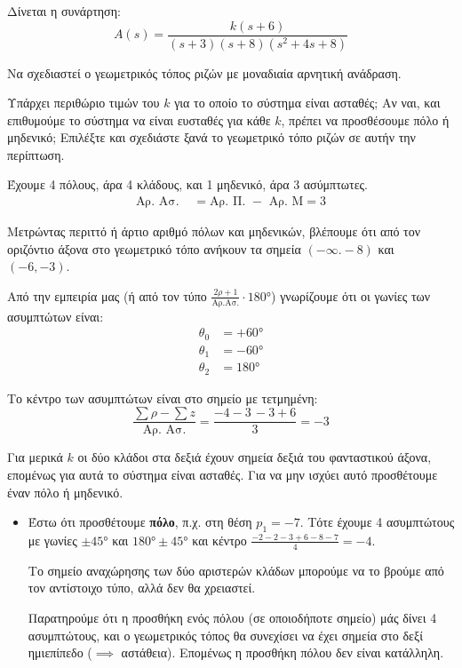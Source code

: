 \documentclass[11pt,a4paper,notitlepage,fleqn]{article}
\begin{document}
\begin{exercise}
Δίνεται η συνάρτηση:
\[
A(s) = \frac{k(s+6)}{(s+3)(s+8)(s^2+4s+8)}
\]

Να σχεδιαστεί ο γεωμετρικός τόπος ριζών με μοναδιαία αρνητική ανάδραση.

Υπάρχει περιθώριο τιμών του \( k \) για το οποίο το σύστημα είναι ασταθές; Αν ναι, και επιθυμούμε το σύστημα να είναι ευσταθές για κάθε \( k \), πρέπει να προσθέσουμε πόλο ή
μηδενικό; Επιλέξτε και σχεδιάστε ξανά το γεωμετρικό τόπο ριζών σε αυτήν την περίπτωση.

\tcblower

Έχουμε 4 πόλους, άρα 4 κλάδους, και 1 μηδενικό, άρα 3 ασύμπτωτες.
\begin{align*}
	\text{Αρ. Ασ. } &=\text{Αρ. Π. } - \text{ Αρ. Μ} = 3
\end{align*}

Μετρώντας περιττό ή άρτιο αριθμό πόλων και μηδενικών, βλέπουμε ότι από τον οριζόντιο άξονα
στο γεωμετρικό τόπο ανήκουν τα σημεία \( (-\infty.-8) \) και \( (-6,-3) \).

Από την εμπειρία μας (ή από τον τύπο \( \frac{2ρ+1}{\text{Αρ.Ασ.}}\cdot\ang{180} \)) γνωρίζουμε ότι οι γωνίες των ασυμπτώτων είναι:
\begin{align*}
	\theta_0 &= +\ang{60}\\
	\theta_1 &= -\ang{60}\\
	\theta_2 &= \ang{180}
\end{align*}

Το κέντρο των ασυμπτώτων είναι στο σημείο με τετμημένη:
\[
\frac{\sum ρ - \sum z}{\text{Αρ. Ασ.}}
= \frac{-4-3\,-3+6}{3} = -3
\]


Για μερικά \( k \) οι δύο κλάδοι στα δεξιά έχουν σημεία δεξιά του φανταστικού άξονα,
επομένως για αυτά το σύστημα είναι ασταθές. Για να μην ισχύει αυτό προσθέτουμε έναν πόλο ή μηδενικό.
\begin{itemize}
	\item Έστω ότι προσθέτουμε \textbf{πόλο}, π.χ. στη θέση \( p_1 = -7 \). Τότε έχουμε 4 ασυμπτώτους
	με γωνίες \( \pm \ang{45} \) και \( \ang{180} \pm \ang{45} \) και κέντρο
	\(\frac{-2-2-3+6-8-7}{4} = -4\).
	
	
	Το σημείο αναχώρησης των δύο αριστερών κλάδων μπορούμε να το βρούμε από τον αντίστοιχο
	τύπο, αλλά δεν θα χρειαστεί.
	
	Παρατηρούμε ότι η προσθήκη ενός πόλου (σε οποιοδήποτε σημείο) μάς δίνει 4 ασυμπτώτους,
	και ο γεωμετρικός τόπος θα συνεχίσει να έχει σημεία στο δεξί ημιεπίπεδο (\( \implies \)
	αστάθεια). Επομένως η προσθήκη πόλου δεν είναι κατάλληλη.
	

\end{itemize}
\end{exercise}
\end{document}
